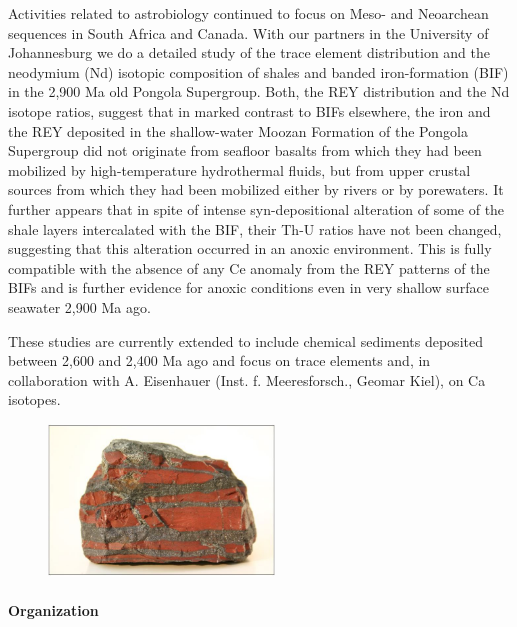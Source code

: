 Activities related to astrobiology continued to focus on Meso- and
Neoarchean sequences in South Africa and Canada. With our partners in
the University of Johannesburg we do a detailed study of the trace
element distribution and the neodymium (Nd) isotopic composition of
shales and banded iron-formation (BIF) in the 2,900 Ma old Pongola
Supergroup. Both, the REY distribution and the Nd isotope ratios,
suggest that in marked contrast to BIFs elsewhere, the iron and the
REY deposited in the shallow-water Moozan Formation of the Pongola
Supergroup did not originate from seafloor basalts from which they had
been mobilized by high-temperature hydrothermal fluids, but from upper
crustal sources from which they had been mobilized either by rivers or
by porewaters. It further appears that in spite of intense
syn-depositional alteration of some of the shale layers intercalated
with the BIF, their Th-U ratios have not been changed, suggesting that
this alteration occurred in an anoxic environment. This is fully
compatible with the absence of any Ce anomaly from the REY patterns of
the BIFs and is further evidence for anoxic conditions even in very
shallow surface seawater 2,900 Ma ago.

These studies are currently extended to include chemical sediments
deposited between 2,600 and 2,400 Ma ago and focus on trace elements
and, in collaboration with A. Eisenhauer (Inst. f. Meeresforsch.,
Geomar Kiel), on Ca isotopes.

\begin{figure}[ht]
  \begin{center}
    \includegraphics[width=6cm]{GeoAstro/Bau/Slide1.png}
\label{fig:bau}
   \end{center}
\end{figure}


\paragraph{Organization}

